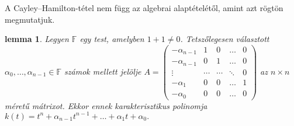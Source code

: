 \documentclass[9pt, a4paper, showtrims]{memoir}
\theoremstyle{plain}
\newtheorem{lemma}[proposition]{lemma}
\theoremstyle{remark}
\theoremstyle{definition}
\begin{document}
A Cayley--Hamilton-tétel nem függ az algebrai alaptételétől, amint azt rögtön megmutatjuk.
\begin{lemma}
    Legyen $\mathbb{F}$ egy test, amelyben $1+1\neq 0$.
    Tetszőlegesen választott $\alpha_0,\dots,\alpha_{n-1}\in\mathbb{F}$ számok mellett
    jelölje
    \(
        A=
        \begin{pmatrix}
            -\alpha_{n-1}&1&0&\dots&0\\
            -\alpha_{n-1}&0&1&\dots&0\\
            \vdots&\cdots&\cdots&\ddots&0\\
            -\alpha_1&0&0&\dots&1\\
            -\alpha_0&0&0&\dots&0
        \end{pmatrix}
    \)
    az $n\times n$ méretű mátrixot.
    Ekkor ennek karakterisztikus polinomja
    \begin{math}
        k\left( t \right)
        =
        t^n+\alpha_{n-1}t^{n-1}+\dots+\alpha_1t+\alpha_0.
    \end{math}
\end{lemma}
\end{document}
